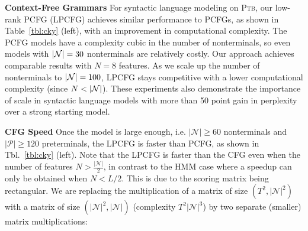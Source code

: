 \documentclass{article}
\begin{document}

\textbf{Context-Free Grammars}
For syntactic language modeling on \textsc{Ptb}, our low-rank PCFG (LPCFG) achieves similar performance to PCFGs, as shown in Table~\ref{tbl:cky} (left), with an improvement in computational complexity. The PCFG models have a complexity cubic in the number of nonterminals, so even models with $|\mathcal{N}|=30$ nonterminals are relatively
costly. Our approach achieves comparable results with $N=8$ features. As we scale up the number of nonterminals to $|\mathcal{N}| = 100$, LPCFG stays competitive with a lower computational complexity (since $N < |\mathcal{N}|$). These experiments also demonstrate the importance of scale in syntactic language models with more than 50 point gain in perplexity over a strong starting model.

\textbf{CFG Speed}
Once the model is large enough, i.e. $|\mathcal{N}|\ge 60$ nonterminals and $|\mathcal{P}|\ge 120$ preterminals, the LPCFG is faster than PCFG, as shown in Tbl.~\ref{tbl:cky} (left). Note that the LPCFG is faster than the CFG even when the number of features $N>\frac{|\mathcal{N}|}{2}$, in contrast to the HMM case where a speedup can only be obtained when $N < L/2$. This is due to the scoring matrix being rectangular. We are replacing the multiplication of a matrix of size $(T^2,|\mathcal{N}|^2)$ with a matrix of size $(|\mathcal{N}|^2, |\mathcal{N}|)$ (complexity $T^2|\mathcal{N}|^3$) by two separate (smaller) matrix multiplications:
\end{document}
